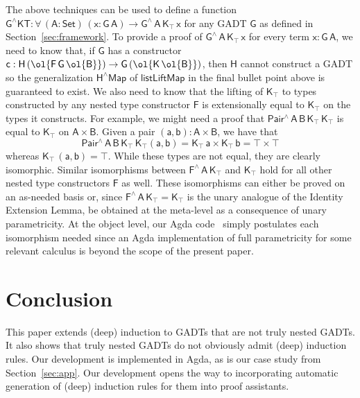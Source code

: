 \documentclass[sigplan,10pt,anonymous,review]{acmart}
\begin{document}
The above techniques can be used to define a function
$\mathsf{G^\wedge KT : \forall\, (A : Set)\, (x : G\,A) \to
  G^{\wedge}\, A\, K_\top\, x}$ for any GADT $\mathsf{G}$ as defined
in Section~\ref{sec:framework}.  To provide a proof of
$\mathsf{G^{\wedge}\, A\, K_\top \, x}$ for every term $\mathsf{x :
  G\, A}$, we need to know that, if $\mathsf{G}$ has a constructor
$\mathsf{c : H \, (\ol{F\,G\, \ol{B}}) \to G\, (\ol{K\,\ol{B}})}$,
then $\mathsf{H}$ cannot construct a GADT so the generalization
$\mathsf{H^\wedge Map}$ of $\mathsf{listLiftMap}$ in the final bullet
point above is guaranteed to exist. We also need to know that the
lifting of $\mathsf{K_\top}$ to types constructed by any nested type
constructor $\mathsf{F}$ is extensionally equal to $\mathsf{K_\top}$
on the types it constructs. For example, we might need a proof that
$\mathsf{Pair^{\wedge}\,A\,B\,K_\top\,K_\top}$ is equal to
$\mathsf{K_\top}$ on $\mathsf{A \times B}$.  Given a pair $\mathsf{(a
  , b) : A \times B}$, we have that
\[\mathsf{Pair^{\wedge}\,A\,B\,K_\top\,K_\top (a, b) = K_\top \, a
  \times K_\top\, b = \top \times \top}\] whereas $\mathsf{K_\top\,
  (a, b) = \top}$. While these types are not equal, they are clearly
isomorphic. Similar isomorphisms between
$\mathsf{F^{\wedge}\,A\,K_\top}$ and $\mathsf{K_\top}$ hold for all
other nested type constructors $\mathsf{F}$ as well. These
isomorphisms can either be proved on an as-needed basis or, since
$\mathsf{F^\wedge\,A\,K_\top = K_\top}$ is the unary analogue of the
Identity Extension Lemma, be obtained at the meta-level as a
consequence of unary parametricity. At the object level, our Agda
code~\cite{web-page} simply postulates each isomorphism needed since
an Agda implementation of full parametricity for some relevant
calculus is beyond the scope of the present paper.

\section{Conclusion}\label{sec:conclusion}

This paper extends (deep) induction to GADTs that are not truly nested
GADTs. It also shows that truly nested GADTs do not obviously admit
(deep) induction rules. Our development is implemented in Agda, as is
our case study from Section~\ref{sec:app}. {\color{red} Our
  development opens the way to incorporating automatic generation of
  (deep) induction rules for them into proof assistants.}



\end{document}
